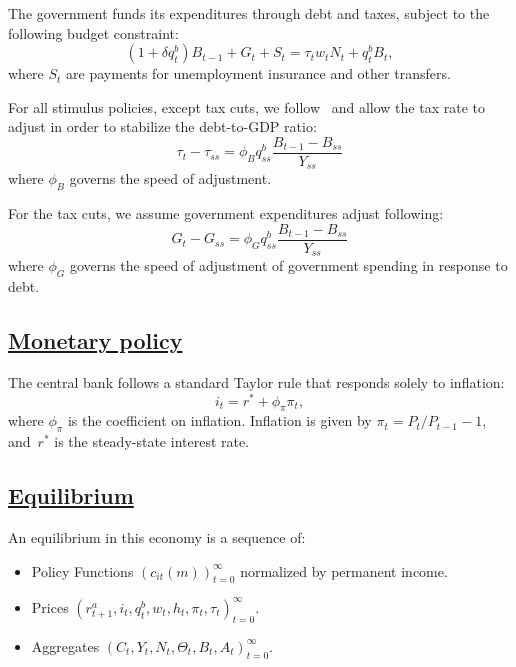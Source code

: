 \documentclass[qe,draft]{econsocart}
\theoremstyle{plain}
\theoremstyle{definition}
\begin{document}
The government funds its expenditures through debt and taxes, subject to the following budget constraint:
\[
  (1 + \delta q^{b}_{t})B_{t-1} + G_{t}  + S_{t} = \tau_{t} w_{t} N_{t}+ q^{b}_{t}B_{t},
\]
where $S_{t}$ are payments for unemployment insurance and other transfers.

For all stimulus policies, except tax cuts, we follow~\cite{arsJumpsHumps} and allow the tax rate to adjust in order to stabilize the debt-to-GDP ratio:
\[
  \tau_{t} - \tau_{ss} = \phi_{B} q^{b}_{ss} \frac{B_{t-1} - B_{ss} }{Y_{ss}}
\]
where $\phi_{B}$ governs the speed of adjustment.

For the tax cuts, we assume government expenditures adjust following:
\[
  G_{t} - G_{ss} = \phi_{G} q^{b}_{ss} \frac{B_{t-1} - B_{ss} }{Y_{ss}}
\]
where $\phi_{G}$ governs the speed of adjustment of government spending in response to debt.

\subsection{\href{https://econ-ark.github.io/HAFiscal/\#sec:hank-monetary-policy}{Monetary policy}}\label{sec:hank-monetary-policy}

The central bank follows a standard Taylor rule that responds solely to inflation:
\[
  i_{t} = r^{*} +\phi_{\pi} \pi_{t},
\]
where $\phi_{\pi}$ is the coefficient on inflation. Inflation is given by $\pi_t = P_t/P_{t-1}-1$, and~$r^{*}$ is the steady-state interest rate.

\subsection{\href{https://econ-ark.github.io/HAFiscal/\#sec:hank-equilibrium}{Equilibrium}}\label{sec:hank-equilibrium}

An equilibrium in this economy is a sequence of:
\begin{itemize}[label=--]
  \item
        Policy Functions ${\left( c_{it}(m) \right )}_{t=0}^{\infty}$ normalized by permanent income.
  \item
        Prices $ {\left( r^{a}_{t+1}, i_{t}, q^{b}_{t},  w_{t}, h_{t} , \pi_{t} , \tau_{t} \right) }_{t=0}^{\infty}$.
  \item
        Aggregates $ {\left(C_{t}, Y_{t} , N_{t},   \Theta_{t},  B_{t} , A_{t}  \right)}_{t=0}^{\infty}$.
\end{itemize}
\end{document}

